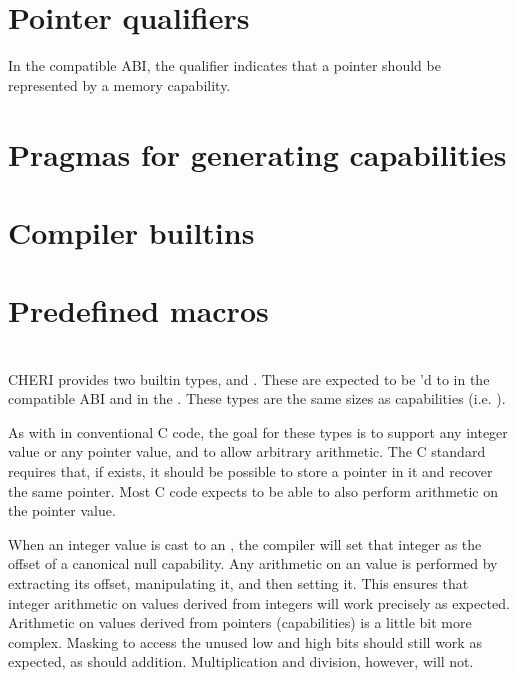 \section{Pointer qualifiers}

In the compatible ABI, the  qualifier indicates that a pointer should be represented by a memory capability.

\section{Pragmas for generating capabilities}

\section{Compiler builtins}
\section{Predefined macros}
\section{}

CHERI provides two builtin types,  and .  These are expected to be 'd to  in the compatible ABI and  in the \sandboxABI.  These types are the same sizes as capabilities (i.e. ).  

As with  in conventional C code, the goal for these types is to support any integer value or any pointer value, and to allow arbitrary arithmetic.  The C standard requires that, if  exists, it should be possible to store a pointer in it and recover the same pointer.  Most C code expects to be able to also perform arithmetic on the pointer value.

When an integer value is cast to an , the compiler will set that integer as the offset of a canonical null capability.  Any arithmetic on an  value is performed by extracting its offset, manipulating it, and then setting it.  This ensures that integer arithmetic on  values derived from integers will work precisely as expected.  Arithmetic on values derived from pointers (capabilities) is a little bit more complex.  Masking to access the unused low and high bits should still work as expected, as should addition.  Multiplication and division, however, will not.

